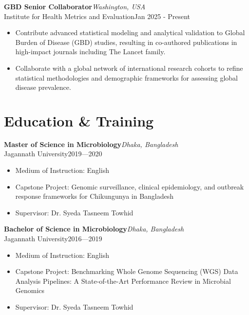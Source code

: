 \documentclass[
  11pt,
  letterpaper,
  DIV=11,
  numbers=noendperiod]{scrartcl}
\begin{document}
\noindent

\begin{minipage}{\linewidth}
\textbf{GBD Senior Collaborator}\hfill \textit{Washington, USA}\\
Institute for Health Metrics and Evaluation\hfill Jan 2025 - Present
\end{minipage}
\begin{itemize}[nosep,topsep=2pt,leftmargin=1em]
  \item Contribute advanced statistical modeling and analytical validation to Global Burden of Disease (GBD) studies, resulting in co-authored publications in high-impact journals including The Lancet family.
  \item Collaborate with a global network of international research cohorts to refine statistical methodologies and demographic frameworks for assessing global disease prevalence.
\end{itemize}
\vspace{5pt}

\section{Education \& Training}\label{education-training}

\noindent

\begin{minipage}{\linewidth}
\textbf{Master of Science in Microbiology}\hfill \textit{Dhaka, Bangladesh}\\
Jagannath University\hfill 2019—2020
\end{minipage}
\begin{itemize}[nosep,topsep=2pt,leftmargin=1em]
  \item Medium of Instruction: English
  \item Capstone Project: Genomic surveillance, clinical epidemiology, and outbreak response frameworks for Chikungunya in Bangladesh
  \item Supervisor: Dr. Syeda Tasneem Towhid
\end{itemize}
\vspace{5pt}

\noindent

\begin{minipage}{\linewidth}
\textbf{Bachelor of Science in Microbiology}\hfill \textit{Dhaka, Bangladesh}\\
Jagannath University\hfill 2016—2019
\end{minipage}
\begin{itemize}[nosep,topsep=2pt,leftmargin=1em]
  \item Medium of Instruction: English
  \item Capstone Project: Benchmarking Whole Genome Sequencing (WGS) Data Analysis Pipelines: A State-of-the-Art Performance Review in Microbial Genomics
  \item Supervisor: Dr. Syeda Tasneem Towhid
\end{itemize}
\vspace{5pt}
\end{document}
